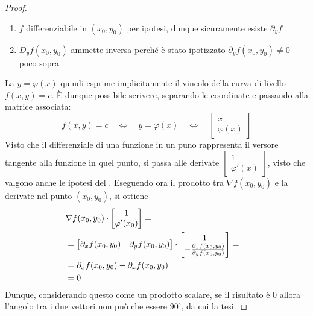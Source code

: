 \begin{proposition}
\begin{proof}
\begin{note}
\begin{enumerate}
				\item $f$ differenziabile in $(x_0, y_0)$ per ipotesi, dunque sicuramente esiste $\partial_y f$
				\item $D_yf(x_0, y_0)$ ammette inversa perché è stato ipotizzato $\partial_y f(x_0,y_0) \neq 0$ poco sopra
			\end{enumerate}
		\end{note}
		La $y = \varphi(x)$ quindi esprime implicitamente il vincolo della curva di livello $f(x, y) = c$. È dunque possibile scrivere, separando le coordinate e passando alla matrice associata:
		\[
			f(x, y) = c \quad \iff \quad y = \varphi(x) \quad \iff \quad
			\begin{bmatrix}
				x\\
				\varphi(x)
			\end{bmatrix}
		\]
		Visto che il differenziale di una funzione in un puno rappresenta il versore tangente alla funzione in quel punto, si passa alle derivate $\begin{bmatrix}1\\\varphi'(x)\end{bmatrix}$, visto che valgono anche le ipotesi del . Eseguendo ora il prodotto tra $\nabla f(x_0, y_0)$ e la derivate nel punto $(x_0, y_0)$, si ottiene
		\begin{align*}
			\lefteqn{\nabla f(x_0, y_0) \cdot \begin{bmatrix}1\\\varphi'(x_0)\end{bmatrix} =}\\
			&= \begin{bmatrix}
				\partial_x f(x_0, y_0) & \partial_y f(x_0, y_0)
			\end{bmatrix}
			\cdot
			\begin{bmatrix}
				1\\
				-\frac{\partial_x f(x_0, y_0)}{\partial_y f(x_0, y_0)}
			\end{bmatrix} =\\
			&= \partial_x f(x_0, y_0) - \partial_x f(x_0, y_0)\\
			&= 0
		\end{align*}
		Dunque, considerando questo come un prodotto scalare, se il risultato è $0$ allora l'angolo tra i due vettori non può che essere $90^\circ$, da cui la tesi.
	\end{proof}
\end{proposition}
